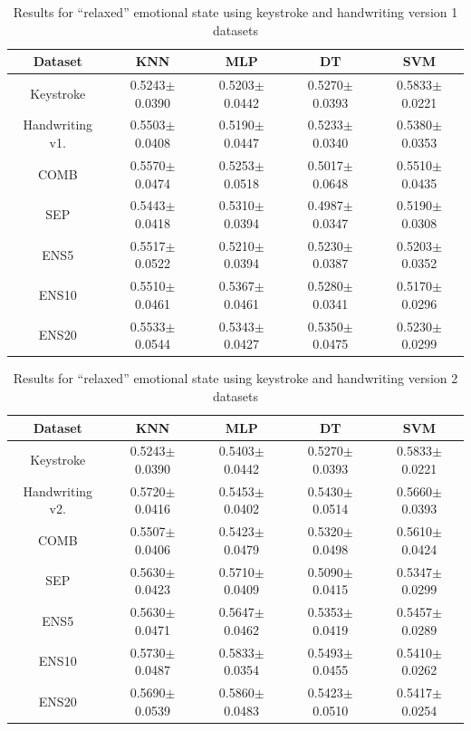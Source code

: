\documentclass[conference]{IEEEtran}
\begin{document}
\begin{table}
    \centering
    \caption{Results for ``relaxed'' emotional state  using keystroke and handwriting version 1 datasets}
    \label{tab:result-relaxed-full}
    \begin{tabular}{|c|c|c|c|c|}
    \hline
    \textbf{Dataset}          & \textbf{KNN}        & \textbf{MLP}        & \textbf{DT}         & \textbf{SVM}        \\ \hline
    Keystroke            & 0.5243$\pm$0.0390 & 0.5203$\pm$0.0442 & 0.5270$\pm$0.0393 & 0.5833$\pm$0.0221 \\ \hline
    Handwriting v1. & 0.5503$\pm$0.0408 & 0.5190$\pm$0.0447 & 0.5233$\pm$0.0340 & 0.5380$\pm$0.0353 \\ \hline
    COMB                & 0.5570$\pm$0.0474 & 0.5253$\pm$0.0518 & 0.5017$\pm$0.0648 & 0.5510$\pm$0.0435 \\ \hline
     SEP                & 0.5443$\pm$0.0418 & 0.5310$\pm$0.0394 & 0.4987$\pm$0.0347 & 0.5190$\pm$0.0308 \\ \hline
     ENS5  & 0.5517$\pm$0.0522 & 0.5210$\pm$0.0394 & 0.5230$\pm$0.0387 & 0.5203$\pm$0.0352 \\ \hline
     ENS10 & 0.5510$\pm$0.0461 & 0.5367$\pm$0.0461 & 0.5280$\pm$0.0341 & 0.5170$\pm$0.0296 \\ \hline
     ENS20 & 0.5533$\pm$0.0544 & 0.5343$\pm$0.0427 & 0.5350$\pm$0.0475 & 0.5230$\pm$0.0299 \\ \hline
    \end{tabular}%
\end{table}

\begin{table}
    \centering
    \caption{Results for ``relaxed'' emotional state  using keystroke and handwriting version 2 datasets}
    \label{tab:result-relaxed-dynamic}
    \begin{tabular}{|c|c|c|c|c|}
    \hline
    \textbf{Dataset}          & \textbf{KNN}        & \textbf{MLP}        & \textbf{DT}         & \textbf{SVM}        \\ \hline
    Keystroke            & 0.5243$\pm$0.0390 & 0.5403$\pm$0.0442 & 0.5270$\pm$0.0393 & 0.5833$\pm$0.0221 \\ \hline
    Handwriting v2. & 0.5720$\pm$0.0416 & 0.5453$\pm$0.0402 & 0.5430$\pm$0.0514 & 0.5660$\pm$0.0393 \\ \hline
    COMB               & 0.5507$\pm$0.0406 & 0.5423$\pm$0.0479 & 0.5320$\pm$0.0498 & 0.5610$\pm$0.0424 \\ \hline
     SEP                & 0.5630$\pm$0.0423 & 0.5710$\pm$0.0409 & 0.5090$\pm$0.0415 & 0.5347$\pm$0.0299 \\ \hline
     ENS5  & 0.5630$\pm$0.0471 & 0.5647$\pm$0.0462 & 0.5353$\pm$0.0419 & 0.5457$\pm$0.0289 \\ \hline
     ENS10 & 0.5730$\pm$0.0487 & 0.5833$\pm$0.0354 & 0.5493$\pm$0.0455 & 0.5410$\pm$0.0262 \\ \hline
     ENS20 & 0.5690$\pm$0.0539 & 0.5860$\pm$0.0483 & 0.5423$\pm$0.0510 & 0.5417$\pm$0.0254 \\ \hline
    \end{tabular}%
\end{table}
\end{document}
